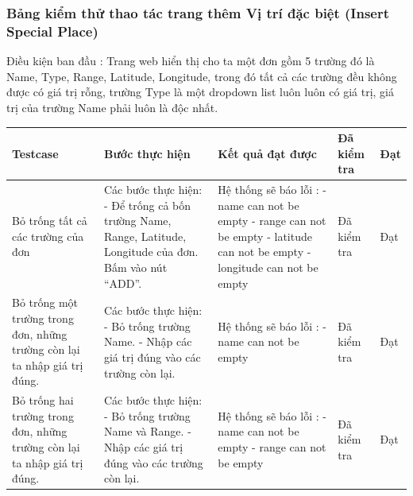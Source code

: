 \documentclass[a4paper]{article}
\begin{document}
\subsubsection*{Bảng kiểm thử thao tác trang thêm Vị trí đặc biệt (Insert Special Place) }
Điều kiện ban đầu : Trang web hiển thị cho ta một đơn gồm 5 trường đó là Name, Type, Range, Latitude, Longitude, trong đó tất cả các trường đều không được có giá trị rỗng, trường Type là một dropdown list luôn luôn có giá trị, giá trị của trường Name phải luôn là độc nhất.

\begin{longtable}{ | p{} |p{} | p{}  | p{}  | p{}  | } 
\hline
\textbf{Testcase}& \textbf{Bước thực hiện}& \textbf{Kết quả đạt được} & \textbf{Đã kiểm tra}& \textbf{Đạt} \\ 
\hline
\hline
Bỏ trống tất cả các trường của đơn &
Các bước thực hiện: \newline
- Để trống cả bốn trường Name, Range, Latitude, Longitude của đơn. \newline
Bấm vào nút “ADD”.
&
Hệ thống sẽ báo lỗi : \newline
- name can not be empty \newline
- range can not be empty \newline
- latitude can not be empty \newline
- longitude can not be empty \newline
&
Đã kiểm tra &
Đạt \\

\hline
Bỏ trống một trường trong đơn, những trường còn lại ta nhập giá trị đúng. &
Các bước thực hiện: \newline
- Bỏ trống trường Name. \newline
- Nhập các giá trị đúng vào các trường còn lại. \newline 
&
Hệ thống sẽ báo lỗi : \newline
- name can not be empty
&
Đã kiểm tra &
Đạt \\

\hline
Bỏ trống hai trường trong đơn, những trường còn lại ta nhập giá trị đúng. &
Các bước thực hiện: \newline
- Bỏ trống trường Name và Range.  \newline
- Nhập các giá trị đúng vào các trường còn lại. \newline 
&
Hệ thống sẽ báo lỗi : \newline
- name can not be empty \newline
- range can not be empty
&
Đã kiểm tra &
Đạt \\


\end{longtable}
\end{document}
